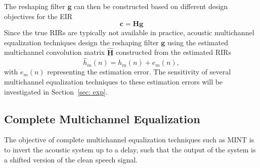 \documentclass[10pt]{IEEEtran}
\begin{document}
The reshaping filter $\mathbf{g}$ can then be constructed based on different design objectives for the EIR
\begin{equation}
\boxed{\mathbf{c} = \mathbf{H}\mathbf{g}}
\end{equation}
Since the true RIRs are typically not available in practice, acoustic multichannel equalization techniques design the reshaping filter $\mathbf{g}$ using the estimated multichannel convolution matrix $\hat{\mathbf{H}}$ constructed from the estimated RIRs
\begin{equation}
\label{eq: hath}
\hat{h}_m(n) = h_m(n) + e_m(n),
\end{equation}
with $e_m(n)$ representing the estimation error.
The sensitivity of several multichannel equalization techniques to these estimation errors will be investigated in Section~\ref{sec: exp}.


\subsection{Complete Multichannel Equalization}
\label{subsec: mint}
The objective of complete multichannel equalization techniques such as MINT is to invert the acoustic system up to a delay, such that the output of the system is a shifted version of the clean speech signal.
\end{document}

